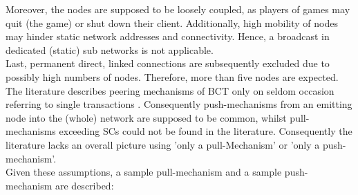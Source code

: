 Moreover, the nodes are supposed to be loosely coupled, as players of games may quit (the game) or shut down their client.
Additionally, high mobility of nodes may hinder static network addresses and connectivity.
Hence, a broadcast in dedicated (static) sub networks is not applicable. \\
Last, permanent direct, linked connections are subsequently excluded due to possibly high numbers of nodes.
Therefore, more than five nodes are expected. \\
The literature describes peering mechanisms of \gls{BCT} only on seldom occasion referring to single transactions \cite[4]{Daniel.2019}.
Consequently push-mechanisms from an emitting node into the (whole) network are supposed to be common,
whilst pull-mechanisms exceeding \gls{SC}s could not be found in the literature.
Consequently the literature lacks an overall picture using 'only a pull-Mechanism' or 'only a push-mechanism'. \\
Given these assumptions, a sample pull-mechanism and a sample push-mechanism are described:



